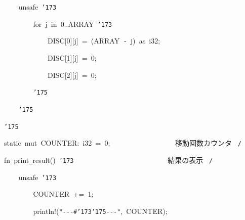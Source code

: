 \documentclass[a4paper,10pt]{article}
\def\mc{\relax}
\begin{document}
\noindent
\mbox{}{\tt\mc \ }{\tt\mc \ }{\tt\mc \ }{\tt\mc \ }unsafe{\tt\mc \ }{\tt\char'173}

\noindent
\mbox{}{\tt\mc \ }{\tt\mc \ }{\tt\mc \ }{\tt\mc \ }{\tt\mc \ }{\tt\mc \ }{\tt\mc \ }{\tt\mc \ }for{\tt\mc \ }j{\tt\mc \ }in{\tt\mc \ }0..ARRAY{\tt\mc \ }{\tt\char'173}

\noindent
\mbox{}{\tt\mc \ }{\tt\mc \ }{\tt\mc \ }{\tt\mc \ }{\tt\mc \ }{\tt\mc \ }{\tt\mc \ }{\tt\mc \ }{\tt\mc \ }{\tt\mc \ }{\tt\mc \ }{\tt\mc \ }DISC[0][j]{\tt\mc \ }={\tt\mc \ }(ARRAY{\tt\mc \ }{\tt -}{\tt\mc \ }j){\tt\mc \ }as{\tt\mc \ }i32;

\noindent
\mbox{}{\tt\mc \ }{\tt\mc \ }{\tt\mc \ }{\tt\mc \ }{\tt\mc \ }{\tt\mc \ }{\tt\mc \ }{\tt\mc \ }{\tt\mc \ }{\tt\mc \ }{\tt\mc \ }{\tt\mc \ }DISC[1][j]{\tt\mc \ }={\tt\mc \ }0;

\noindent
\mbox{}{\tt\mc \ }{\tt\mc \ }{\tt\mc \ }{\tt\mc \ }{\tt\mc \ }{\tt\mc \ }{\tt\mc \ }{\tt\mc \ }{\tt\mc \ }{\tt\mc \ }{\tt\mc \ }{\tt\mc \ }DISC[2][j]{\tt\mc \ }={\tt\mc \ }0;

\noindent
\mbox{}{\tt\mc \ }{\tt\mc \ }{\tt\mc \ }{\tt\mc \ }{\tt\mc \ }{\tt\mc \ }{\tt\mc \ }{\tt\mc \ }{\tt\char'175}

\noindent
\mbox{}{\tt\mc \ }{\tt\mc \ }{\tt\mc \ }{\tt\mc \ }{\tt\char'175}

\noindent
\mbox{}{\tt\char'175}

\noindent
\mbox{}\hfill

\noindent
\mbox{}static{\tt\mc \ }mut{\tt\mc \ }COUNTER:{\tt\mc \ }i32{\tt\mc \ }={\tt\mc \ }0;{\tt\mc \ \ \ \ \ \ \ \ }{\tt\mc \ \ \ \ \ \ \ \ }\rm\mc {\tt /}{\tt *}\  \ 移動回数カウンタ \hfill \rm\mc \ {\tt *}{\tt /}
\tt\mc 

\noindent
\mbox{}\hfill

\noindent
\mbox{}fn{\tt\mc \ }print{\tt\_}result(){\tt\mc \ }{\tt\char'173}{\tt\mc \ \ \ \ \ \ \ \ }{\tt\mc \ \ \ \ \ \ \ \ }{\tt\mc \ \ \ \ \ \ \ \ }\rm\mc {\tt /}{\tt *}\  \ 結果の表示 \hfill \rm\mc \ {\tt *}{\tt /}
\tt\mc 

\noindent
\mbox{}{\tt\mc \ }{\tt\mc \ }{\tt\mc \ }{\tt\mc \ }unsafe{\tt\mc \ }{\tt\char'173}

\noindent
\mbox{}{\tt\mc \ }{\tt\mc \ }{\tt\mc \ }{\tt\mc \ }{\tt\mc \ }{\tt\mc \ }{\tt\mc \ }{\tt\mc \ }COUNTER{\tt\mc \ }+={\tt\mc \ }1;

\noindent
\mbox{}{\tt\mc \ }{\tt\mc \ }{\tt\mc \ }{\tt\mc \ }{\tt\mc \ }{\tt\mc \ }{\tt\mc \ }{\tt\mc \ }println!({\tt "}{\tt -}{\tt -}{\tt -}{\tt\#}{\tt\char'173}{\tt\char'175}{\tt -}{\tt -}{\tt -}{\tt "},{\tt\mc \ }COUNTER);
\end{document}

